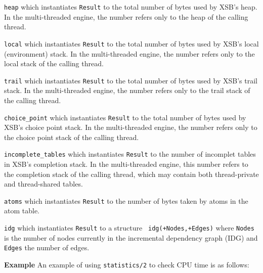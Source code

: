 \begin{description}
%
%
\item {\tt heap} which instantiates {\tt Result} to the total number
 of bytes used by XSB's heap.  In the multi-threaded engine, the
 number refers only to the heap of the calling thread.
%
\item {\tt local} which instantiates {\tt Result} to the total number
 of bytes used by XSB's local (environment) stack.  In the
 multi-threaded engine, the number refers only to the local stack of
 the calling thread.
%
\item {\tt trail} which instantiates {\tt Result} to the total number
 of bytes used by XSB's trail stack.  In the multi-threaded engine,
 the number refers only to the trail stack of the calling thread.
%
\item {\tt choice\_point} which instantiates {\tt Result} to the total
 number of bytes used by XSB's choice point stack.  In the
 multi-threaded engine, the number refers only to the choice point
 stack of the calling thread.
%
\item {\tt incomplete\_tables} which instantiates {\tt Result} to the
 number of incomplet tables in XSB's completion stack.  In the
 multi-threaded engine, this number refers to the completion stack of
 the calling thread, which may contain both thread-private and
 thread-shared tables.
%
\item {\tt atoms} which instantiates {\tt Result} to the number of
 bytes taken by atoms in the atom table.
%
\item {\tt idg} which instantiates {\tt Result} to a structure {\tt
 idg(+Nodes,+Edges)} where {\tt Nodes} is the number of nodes
 currently in the incremental dependency graph (IDG) and {\tt Edges}
 the number of edges.
%
\ei

{\bf Example}
An example of using {\tt statistics/2} to check CPU time is as follows:


\end{description}
